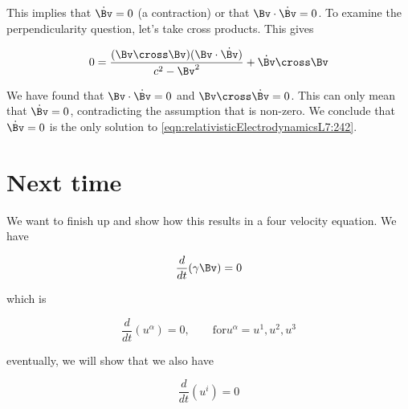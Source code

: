 This implies that $\dot{\Bv} = 0$ (a contraction) or that $\Bv \cdot \dot{\Bv} = 0$.  To examine the perpendicularity question, let's take cross products.  This gives

\begin{equation}\label{eqn:relativisticElectrodynamicsL7:243}
0 =
\frac{(\Bv \cross \Bv) (\Bv \cdot \dot{\Bv}) }{ c^2 - \Bv^2 } + \dot{\Bv} \cross \Bv
\end{equation}

We have found that $\Bv \cdot \dot{\Bv} = 0$ and $\Bv \cross \dot{\Bv} = 0$.  This can only mean that $\dot{\Bv} = 0$, contradicting the assumption that is non-zero.  We conclude that $\dot{\Bv} = 0$ is the only solution to \ref{eqn:relativisticElectrodynamicsL7:242}.

\section{Next time}

We want to finish up and show how this results in a four velocity equation.  We have

\begin{equation}\label{eqn:relativisticElectrodynamicsL7:250}
\frac{d}{dt} ( \gamma \Bv) = 0
\end{equation}

which is

\begin{equation}\label{eqn:relativisticElectrodynamicsL7:260}
\frac{d}{dt} ( u^\alpha ) = 0, \qquad \text{for} u^\alpha = u^1, u^2, u^3
\end{equation}

eventually, we will show that we also have

\begin{equation}\label{eqn:relativisticElectrodynamicsL7:270}
\frac{d}{dt} ( u^i ) = 0
\end{equation}

\EndArticle
